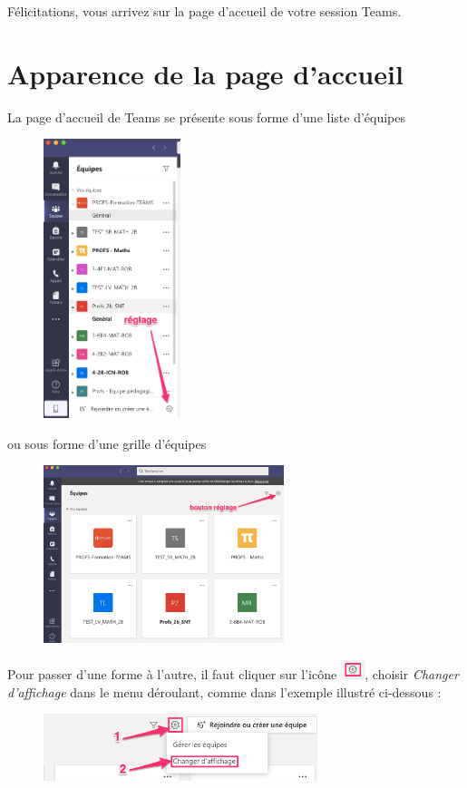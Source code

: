Félicitations, vous arrivez sur la page d'accueil de votre session Teams.



\section{Apparence de la page d'accueil}

La page d'accueil de Teams se présente sous forme d'une liste d'équipes

\begin{figure}[h]
\includegraphics[width=4cm]{./images/teams/accueil_liste}
\centering
\end{figure}

ou sous forme d'une grille d'équipes 
\newpage
\begin{figure}[h]
\includegraphics[width=7cm]{./images/teams/accueil_grille}
\centering
\end{figure}

Pour passer d'une forme à l'autre, il faut cliquer sur l'icône \includegraphics[width=0.7cm]{./images/teams/bouton_parametres}, choisir \textit{Changer d'affichage} dans le menu déroulant, comme dans l'exemple illustré ci-dessous :
\newpage
\begin{figure}[h]
\includegraphics[width=8cm]{./images/teams/changement_liste}
\centering
\end{figure}

